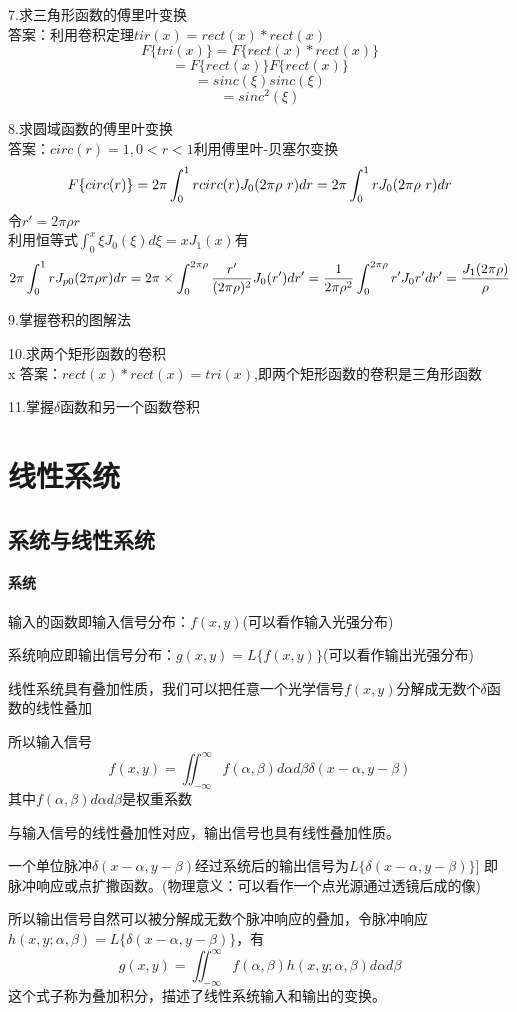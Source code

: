 \documentclass[UTF8]{ctexart}
\newcommand{\f}[2]{\frac{#1}{#2}}%
\begin{document}
7.求三角形函数的傅里叶变换\\
答案：利用卷积定理$tir(x)=rect(x)*rect(x)$
\[
F\{tri(x)\}=F\{rect(x)*rect(x)\}
    \]
\[=F\{rect(x)\}F\{rect(x)\}
    \]
\[=sinc(\xi)sinc(\xi)
    \]
\[=sinc^2(\xi)
    \]

8.求圆域函数的傅里叶变换\\
答案：$circ(r)=1,0<r<1$利用傅里叶-贝塞尔变换
\[ F\{circ(r)\}=2\pi\int_{0}^{1}rcirc(r)J_{0}(2\pi\rho\ r)dr
\\
=2\pi\int_{0}^{1}rJ_{0}(2\pi\rho\ r)dr
\]
令$r'=2\pi \rho r$\\
利用恒等式$\int_{0}^{x}\xi J_{0}(\xi)d\xi=xJ_{1}(x)$有
\[
    2\pi\int_{0}^{1}rJ_{p0}(2\pi\rho r)dr=2\pi\times\int_{0}^{2\pi\rho}\f{r'}{(2\pi\rho)^2}J_{0}(r')dr'
\\
=\f{1}{2\pi\rho^2}\int_{0}^{2\pi\rho}r'J_{0}r'dr'=\f{J_{1}(2\pi\rho)}{\rho}
\]

9.掌握卷积的图解法

10.求两个矩形函数的卷积\\x
答案：$rect(x)*rect(x)=tri(x)$,即两个矩形函数的卷积是三角形函数

11.掌握$\delta$函数和另一个函数卷积
\section{线性系统}
\subsection{系统与线性系统}
\paragraph{系统}
输入的函数即输入信号分布：$f(x,y)$(可以看作输入光强分布)

系统响应即输出信号分布：$g(x,y)=L\{f(x,y)\}$(可以看作输出光强分布)


线性系统具有叠加性质，我们可以把任意一个光学信号$f(x,y)$分解成无数个$\delta$函数的线性叠加

所以输入信号
\[
    f(x,y)=\iint_{-\infty}^{\infty}f(\alpha,\beta)d\alpha d\beta\delta(x-\alpha,y-\beta)       
\]
其中$f(\alpha,\beta)d\alpha d\beta$是权重系数

与输入信号的线性叠加性对应，输出信号也具有线性叠加性质。

一个单位脉冲$\delta(x-\alpha,y-\beta)$经过系统后的输出信号为$L\{\delta(x-\alpha,y-\beta)\}]$
即脉冲响应或点扩撒函数。(物理意义：可以看作一个点光源通过透镜后成的像)

所以输出信号自然可以被分解成无数个脉冲响应的叠加，令脉冲响应$h(x,y;\alpha,\beta)=L\{\delta(x-\alpha,y-\beta)\}$，有
\[g(x,y)=\iint_{-\infty}^{\infty}f(\alpha,\beta)h(x,y;\alpha,\beta)d\alpha d\beta
    \]
这个式子称为叠加积分，描述了线性系统输入和输出的变换。
\end{document}

